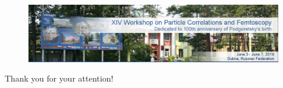 \documentclass[dvipsnames] {beamer}
\begin{document}
      \begin{frame}
        \bf 
        \frametitle{}
        \begin{figure}[H]
          \includegraphics[width=1.\textwidth]{wpcf2019.png} 
        \end{figure}
        \begin{center}
        {\Huge  Thank you for your attention!}
        \end{center}
      \end{frame}      
      
\end{document}
